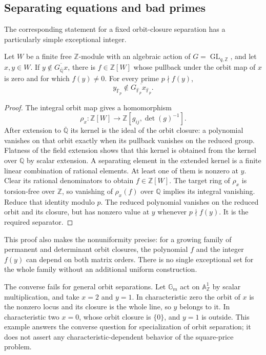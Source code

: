 \subsection{Separating equations and bad primes}

The corresponding statement for a fixed orbit-closure
separation has a particularly simple exceptional integer.

\begin{proposition}
\label{prop:integral-separation}
Let $W$ be a finite free $\mathbb Z$-module with an
algebraic action of $G=\operatorname{GL}_{q,\mathbb Z}$,
and let $x,y\in W$.  If
$y\notin\overline{G_{\overline{\mathbb Q}}x}$,
there is $f\in\mathbb Z[W]$ whose pullback under the
orbit map of $x$ is zero and for which $f(y)\ne0$.
For every prime $p\nmid f(y)$,
\[
 y_{\overline{\mathbb F}_p}\notin
 \overline{G_{\overline{\mathbb F}_p}
 x_{\overline{\mathbb F}_p}}.
\]
\end{proposition}

\begin{proof}
The integral orbit map gives a homomorphism
\[
 \rho_x:\mathbb Z[W]\longrightarrow
 \mathbb Z[g_{ij},\det(g)^{-1}].
\]
After extension to $\overline{\mathbb Q}$ its kernel
is the ideal of the orbit closure: a polynomial
vanishes on that orbit exactly when its pullback
vanishes on the reduced group.  Flatness of the
field extension shows that this kernel is obtained
from the kernel over $\mathbb Q$ by scalar extension.
A separating element in the extended kernel is a
finite linear combination of rational elements.
At least one of them is nonzero at $y$.  Clear
its rational denominators to obtain $f\in\mathbb Z[W]$.
The target ring of $\rho_x$ is torsion-free over
$\mathbb Z$, so vanishing of $\rho_x(f)$ over
$\mathbb Q$ implies its integral vanishing.
Reduce that identity modulo $p$.  The reduced
polynomial vanishes on the reduced orbit and its
closure, but has nonzero value at $y$ whenever
$p\nmid f(y)$.  It is the required separator.
\end{proof}

This proof also makes the nonuniformity precise: for a
growing family of permanent and determinant orbit
closures, the polynomial $f$ and the integer $f(y)$
can depend on both matrix orders.  There is no
single exceptional set for the whole family without
an additional uniform construction.

The converse fails for general orbit separations.
Let $\mathbb G_m$ act on $\mathbb A^1_{\mathbb Z}$
by scalar multiplication, and take $x=2$ and $y=1$.
In characteristic zero the orbit of $x$ is the
nonzero locus and its closure is the whole line,
so $y$ belongs to it.  In characteristic two $x=0$,
whose orbit closure is $\{0\}$, and $y=1$ is
outside.  This example answers the converse
question for specialization of orbit separation;
it does not assert any characteristic-dependent
behavior of the square-price problem.

